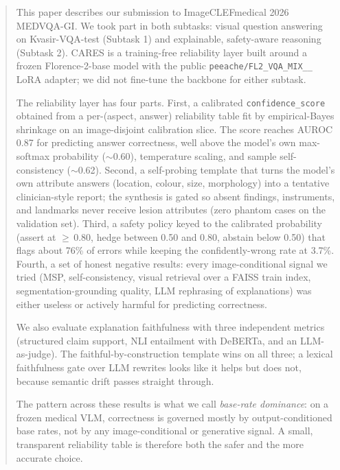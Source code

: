 \documentclass{ceurart}
\begin{document}
\begin{abstract}
This paper describes our submission to ImageCLEFmedical 2026
MEDVQA-GI. We took part in both subtasks: visual question answering
on Kvasir-VQA-test (Subtask 1) and explainable, safety-aware
reasoning (Subtask 2). CARES is a training-free reliability layer built around a frozen
Florence-2-base model with the public
\texttt{peeache/\allowbreak FL2\_\allowbreak VQA\_\allowbreak MIX\_\_} LoRA adapter; we did not
fine-tune the backbone for either subtask.

The reliability layer has four parts. First, a calibrated
\texttt{confidence\_score} obtained from a per-(aspect, answer)
reliability table fit by empirical-Bayes shrinkage on an
image-disjoint calibration slice. The score reaches AUROC 0.87 for
predicting answer correctness, well above the
model's own max-softmax probability ($\sim$0.60), temperature
scaling, and sample self-consistency ($\sim$0.62). Second, a
self-probing template that turns the model's own attribute answers
(location, colour, size, morphology) into a tentative
clinician-style report; the synthesis is gated so absent findings,
instruments, and landmarks never receive lesion attributes (zero
phantom cases on the validation set). Third, a safety policy keyed
to the calibrated probability (assert at $\geq$\,0.80, hedge between
0.50 and 0.80, abstain below 0.50) that flags about 76\% of errors
while keeping the confidently-wrong rate at 3.7\%. Fourth, a set of
honest negative results: every image-conditional signal we tried
(MSP, self-consistency, visual retrieval over a FAISS train index,
segmentation-grounding quality, LLM rephrasing of explanations) was
either useless or actively harmful for predicting correctness.

We also evaluate explanation faithfulness with three independent
metrics (structured claim support, NLI entailment with DeBERTa, and
an LLM-as-judge). The faithful-by-construction template wins on all
three; a lexical faithfulness gate over LLM rewrites looks like it
helps but does not, because semantic drift passes straight through.

The pattern across these results is what we call \emph{base-rate
dominance}: on a frozen medical VLM, correctness is governed mostly
by output-conditioned base rates, not by any image-conditional or
generative signal. A small, transparent reliability table is
therefore both the safer and the more accurate choice.
\end{abstract}
\end{document}
